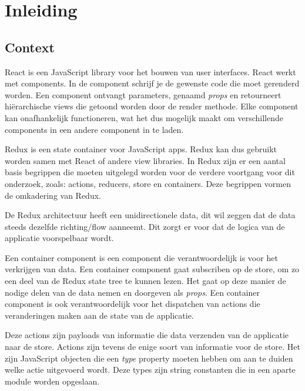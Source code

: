 
\chapter*{Inleiding}
\label{ch:inleiding}

\section{Context}
\label{sec:context}

React is een JavaScript library voor het bouwen van user interfaces. React werkt met components. In de component schrijf je de gewenste code die moet gerenderd worden. Een component ontvangt parameters, genaamd \textit{props} en retourneert hiërarchische views die getoond worden door de render methode. Elke component kan onafhankelijk functioneren, wat het dus mogelijk maakt om verschillende components in een andere component in te laden. \autocite{React01} 

Redux is een state container voor JavaScript apps. Redux kan dus gebruikt worden samen met React of andere view libraries. 
In Redux zijn er een aantal basis begrippen die moeten uitgelegd worden voor de verdere voortgang voor dit onderzoek, zoals: actions, reducers, store en containers. Deze begrippen vormen de omkadering van Redux. \autocite{Redux02}

De Redux architectuur heeft een unidirectionele data, dit wil zeggen dat de data steeds dezelfde richting/flow aanneemt. Dit zorgt er voor dat de logica van de applicatie voorspelbaar wordt.  

Een container component is een component die verantwoordelijk is voor het verkrijgen van data. Een container component gaat subscriben op de store, om zo een deel van de Redux state tree te kunnen lezen. Het gaat op deze manier de nodige delen van de data nemen en doorgeven als \textit{props}. Een container component is ook verantwoordelijk voor het dispatchen van actions die veranderingen maken aan de state van de applicatie. 

Deze actions zijn payloads van informatie die data verzenden van de applicatie naar de store. Actions zijn tevens de enige soort van informatie voor de store. Het zijn JavaScript objecten die een \textit{type} property moeten hebben om aan te duiden welke actie uitgevoerd wordt. Deze types zijn string constanten die in een aparte module worden opgeslaan. 

